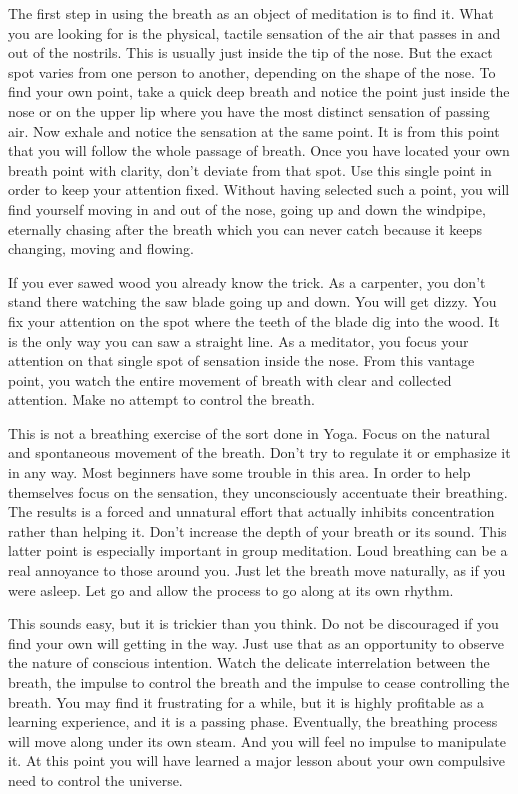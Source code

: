 The first step in using the breath as an object of meditation is to find it.
What you are looking for is the physical, tactile sensation of the air that
passes in and out of the nostrils. This is usually just inside the tip of the
nose. But the exact spot varies from one person to another, depending on the
shape of the nose. To find your own point, take a quick deep breath and notice
the point just inside the nose or on the upper lip where you have the most
distinct sensation of passing air. Now exhale and notice the sensation at the
same point. It is from this point that you will follow the whole passage of
breath. Once you have located your own breath point with clarity, don't deviate
from that spot. Use this single point in order to keep your attention fixed.
Without having selected such a point, you will find yourself moving in and out
of the nose, going up and down the windpipe, eternally chasing after the breath
which you can never catch because it keeps changing, moving and flowing.

If you ever sawed wood you already know the trick. As a carpenter, you don't
stand there watching the saw blade going up and down. You will get dizzy. You
fix your attention on the spot where the teeth of the blade dig into the wood.
It is the only way you can saw a straight line. As a meditator, you focus your
attention on that single spot of sensation inside the nose. From this vantage
point, you watch the entire movement of breath with clear and collected
attention. Make no attempt to control the breath.

This is not a breathing exercise of the sort done in Yoga. Focus on the natural
and spontaneous movement of the breath. Don't try to regulate it or emphasize it
in any way. Most beginners have some trouble in this area. In order to help
themselves focus on the sensation, they unconsciously accentuate their
breathing. The results is a forced and unnatural effort that actually inhibits
concentration rather than helping it. Don't increase the depth of your breath or
its sound. This latter point is especially important in group meditation. Loud
breathing can be a real annoyance to those around you. Just let the breath move
naturally, as if you were asleep. Let go and allow the process to go along at
its own rhythm.

This sounds easy, but it is trickier than you think. Do not be discouraged if
you find your own will getting in the way. Just use that as an opportunity to
observe the nature of conscious intention. Watch the delicate interrelation
between the breath, the impulse to control the breath and the impulse to cease
controlling the breath. You may find it frustrating for a while, but it is
highly profitable as a learning experience, and it is a passing phase.
Eventually, the breathing process will move along under its own steam. And you
will feel no impulse to manipulate it. At this point you will have learned a
major lesson about your own compulsive need to control the universe.


